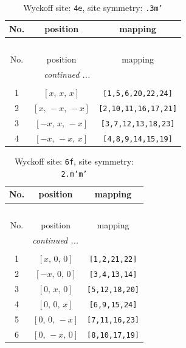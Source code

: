 \documentclass[fleqn,8pt]{jsarticle}
\begin{document}
\begin{longtable}{ccc}
\caption{Wyckoff site: {\tt 4e}, site symmetry: {\tt .3m'}}
 \\
 \hline \hline
No. & position & mapping \\ \hline \endfirsthead

\multicolumn{2}{l}{\tablename\ \thetable{}} \\
 \hline \hline
No. & position & mapping \\ \hline \endhead

 \hline \hline
\multicolumn{2}{r}{\footnotesize\it continued ...} \\ \endfoot

 \hline \hline
\multicolumn{2}{r}{} \\ \endlastfoot

1 & $\left[ x,\, x,\, x \right]$ & {\tt [1,5,6,20,22,24]} \\ \hline
2 & $\left[ x,\, - x,\, - x \right]$ & {\tt [2,10,11,16,17,21]} \\ \hline
3 & $\left[ - x,\, x,\, - x \right]$ & {\tt [3,7,12,13,18,23]} \\ \hline
4 & $\left[ - x,\, - x,\, x \right]$ & {\tt [4,8,9,14,15,19]} \\
\end{longtable}
\renewcommand{\arraystretch}{1.2}
\begin{longtable}{ccc}
\caption{Wyckoff site: {\tt 6f}, site symmetry: {\tt 2.m'm'}}
 \\
 \hline \hline
No. & position & mapping \\ \hline \endfirsthead

\multicolumn{2}{l}{\tablename\ \thetable{}} \\
 \hline \hline
No. & position & mapping \\ \hline \endhead

 \hline \hline
\multicolumn{2}{r}{\footnotesize\it continued ...} \\ \endfoot

 \hline \hline
\multicolumn{2}{r}{} \\ \endlastfoot

1 & $\left[ x,\, 0,\, 0 \right]$ & {\tt [1,2,21,22]} \\ \hline
2 & $\left[ - x,\, 0,\, 0 \right]$ & {\tt [3,4,13,14]} \\ \hline
3 & $\left[ 0,\, x,\, 0 \right]$ & {\tt [5,12,18,20]} \\ \hline
4 & $\left[ 0,\, 0,\, x \right]$ & {\tt [6,9,15,24]} \\ \hline
5 & $\left[ 0,\, 0,\, - x \right]$ & {\tt [7,11,16,23]} \\ \hline
6 & $\left[ 0,\, - x,\, 0 \right]$ & {\tt [8,10,17,19]} \\
\end{longtable}
\end{document}
